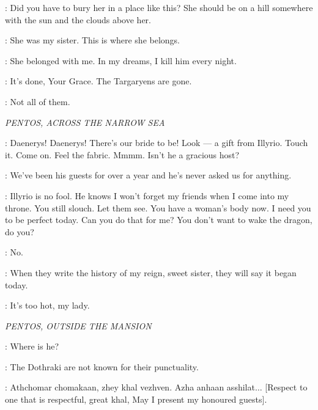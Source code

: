 \ROBERT: Did you have to bury her in a place like this? She should be on a hill somewhere with the sun and the clouds above her. 

\NED: She was my sister. This is where she belongs. 

\ROBERT: She belonged with me. In my dreams, I kill him every night. 

\NED: It's done, Your Grace. The Targaryens are gone. 

\ROBERT: Not all of them. 


\scene

\textit{PENTOS, ACROSS THE NARROW SEA} 


\VISERYS: Daenerys! Daenerys! There's our bride to be! Look --- a gift from Illyrio. Touch it. Come on. Feel the fabric. Mmmm. Isn't he a gracious host? 

\DAENERYS: We've been his guests for over a year and he's never asked us for anything. 

\VISERYS: Illyrio is no fool. He knows I won't forget my friends when I come into my throne. You still slouch. Let them see.  You have a woman's body now.  I need you to be perfect today. Can you do that for me? You don't want to wake the dragon, do you? 

\DAENERYS: No. 


\VISERYS: When they write the history of my reign, sweet sister, they will say it began today. 


\MAID: It's too hot, my lady. 


\scene

\textit{PENTOS, OUTSIDE THE MANSION} 


\VISERYS: Where is he? 

\ILLYRIO: The Dothraki are not known for their punctuality. 


\ILLYRIO: Athchomar chomakaan, zhey khal vezhven. Azha anhaan asshilat$\ldots$ [Respect to one that is respectful, great khal, May I present my honoured guests]. 

